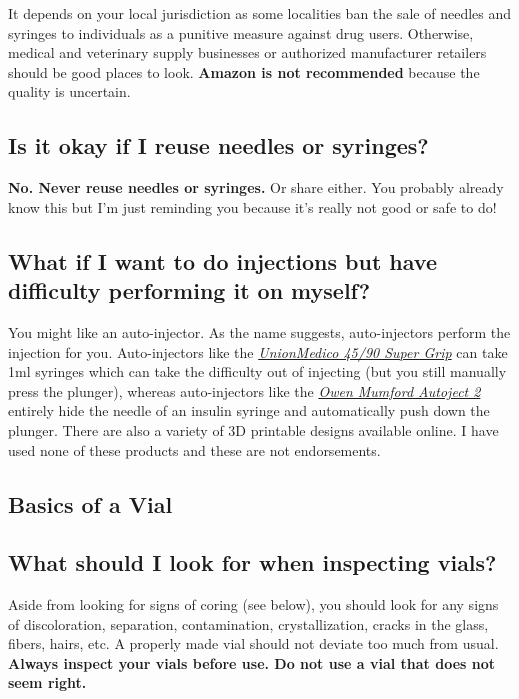 \documentclass{article}
\begin{document}
It depends on your local jurisdiction as some localities ban the sale of needles and syringes to individuals as a punitive measure against drug users. Otherwise, medical and veterinary supply businesses or authorized manufacturer retailers should be good places to look. \textbf{Amazon is not recommended} because the quality is uncertain.

\subsection{Is it okay if I reuse needles or syringes?}

\textbf{No. Never reuse needles or syringes. }Or share either. You probably already know this but I’m just reminding you because it’s really not good or safe to do!

\subsection{What if I want to do injections but have difficulty performing it on myself?}\label{5-21}

You might like an auto-injector. As the name suggests, auto-injectors perform the injection for you. Auto-injectors like the \href{https://unionmedico.com/90-super-grip/}{\textit{UnionMedico 45/90 Super Grip}} can take 1ml syringes which can take the difficulty out of injecting (but you still manually press the plunger), whereas auto-injectors like the \href{https://www.owenmumford.com/us/medical-devices/autoject-2}{\textit{Owen Mumford Autoject 2}} entirely hide the needle of an insulin syringe and automatically push down the plunger. There are also a variety of 3D printable designs available online. I have used none of these products and these are not endorsements.

\subsection*{Basics of a Vial}

\subsection{What should I look for when inspecting vials?}

Aside from looking for signs of coring (see below), you should look for any signs of discoloration, separation, contamination, crystallization, cracks in the glass, fibers, hairs, etc. A properly made vial should not deviate too much from usual. \textbf{Always inspect your vials before use. Do not use a vial that does not seem right.}
\end{document}
